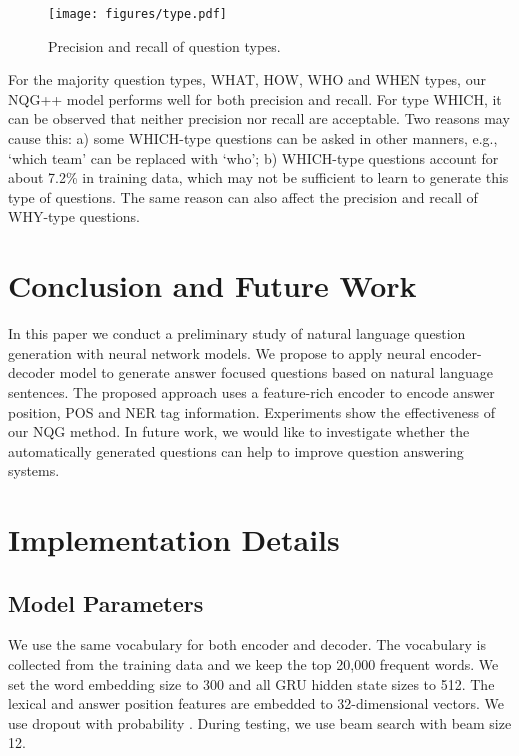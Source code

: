 \documentclass[11pt,letterpaper]{article}
\newcommand{\ourModelName}{NQG}
\begin{document}
\begin{figure}[ht]
	\centering
	\texttt{[image: figures/type.pdf]}
	\caption{\label{fig:type}Precision and recall of question types.
	}
\end{figure}

For the majority question types, WHAT, HOW, WHO and WHEN types, our \ourModelName{}++ model performs well for both precision and recall.
For type WHICH, it can be observed that neither precision nor recall are acceptable.
Two reasons may cause this: a) some WHICH-type questions can be asked in other manners, e.g., `which team' can be replaced with `who'; b) WHICH-type questions account for about 7.2\% in training data, which may not be sufficient to learn to generate this type of questions. The same reason can also affect the precision and recall of WHY-type questions.






 
\section{Conclusion and Future Work}
In this paper we conduct a preliminary study of natural language question generation with neural network models.
We propose to apply neural encoder-decoder model to generate answer focused questions based on natural language sentences.
The proposed approach uses a feature-rich encoder to encode answer position, POS and NER tag information.
Experiments show the effectiveness of our \ourModelName{} method.
In future work, we would like to investigate whether the automatically generated questions can help to improve question answering systems.



\appendix



\section{Implementation Details}

\subsection{Model Parameters}
We use the same vocabulary for both encoder and decoder.
The vocabulary is collected from the training data and we keep the top 20,000 frequent words.
We set the word embedding size to 300 and all GRU hidden state sizes to 512.
The lexical and answer position features are embedded to 32-dimensional vectors.
We use dropout \citep{srivastava2014dropout} with probability .
During testing, we use beam search with beam size 12.
\end{document}

